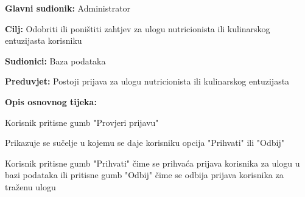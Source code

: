                     \noindent {}
                    \begin{packed_item}
    
                        \item \textbf{Glavni sudionik: }Administrator
                        \item  \textbf{Cilj:} Odobriti ili poništiti zahtjev za ulogu nutricionista ili kulinarskog entuzijasta korisniku
                        \item  \textbf{Sudionici:} Baza podataka
                        \item  \textbf{Preduvjet:} Postoji prijava za ulogu nutricionista ili kulinarskog entuzijasta
                        \item  \textbf{Opis osnovnog tijeka:} 
                        
                        \item[] \begin{packed_enum}
    
                            \item Korisnik pritisne gumb "Provjeri prijavu"
                            \item Prikazuje se sučelje u kojemu se daje korisniku opcija "Prihvati" ili "Odbij"
                            \item Korisnik pritisne gumb "Prihvati" čime se prihvaća prijava korisnika za ulogu u bazi podataka ili pritisne gumb "Odbij" čime se odbija prijava korisnika za traženu ulogu
                        \end{packed_enum}
                        
                    \end{packed_item}  					



